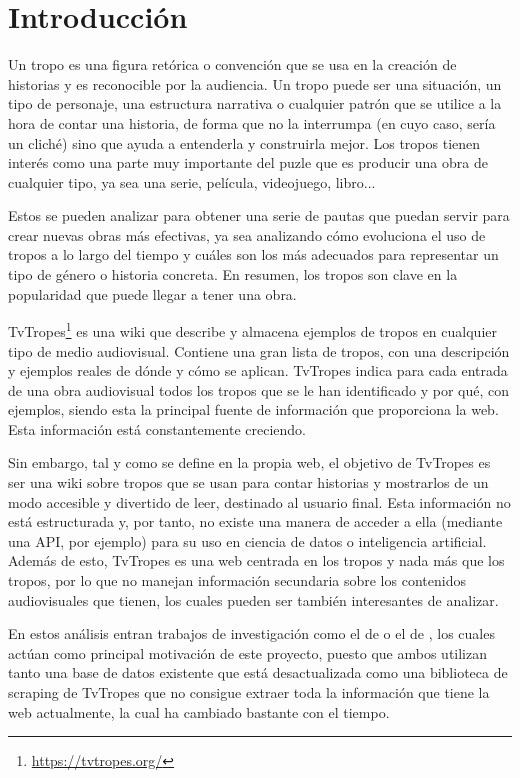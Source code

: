 \chapter{Introducción}

Un tropo es una figura retórica o convención que se usa en la creación de historias y es reconocible por la audiencia. Un tropo puede ser una situación, un tipo de personaje, una estructura narrativa o cualquier patrón que se utilice a la hora de contar una historia, de forma que no la interrumpa (en cuyo caso, sería un cliché) sino que ayuda a entenderla y construirla mejor. Los tropos tienen interés como una parte muy importante del puzle que es producir una obra de cualquier tipo, ya sea una serie, película, videojuego, libro... 

Estos se pueden analizar para obtener una serie de pautas que puedan servir para crear nuevas obras más efectivas, ya sea analizando cómo evoluciona el uso de tropos a lo largo del tiempo y cuáles son los más adecuados para representar un tipo de género o historia concreta. En resumen, los tropos son clave en la popularidad que puede llegar a tener una obra. 

TvTropes\footnote{\url{https://tvtropes.org/}} es una wiki que describe y almacena ejemplos de tropos en cualquier tipo de medio audiovisual. Contiene una gran lista de tropos, con una descripción y ejemplos reales de dónde y cómo se aplican. TvTropes indica para cada entrada de una obra audiovisual todos los tropos que se le han identificado y por qué, con ejemplos, siendo esta la principal fuente de información que proporciona la web. Esta información está constantemente creciendo.

Sin embargo, tal y como se define en la propia web, el objetivo de TvTropes es ser una wiki sobre tropos que se usan para contar historias y mostrarlos de un modo accesible y divertido de leer, destinado al usuario final. Esta información no está estructurada y, por tanto, no existe una manera de acceder a ella (mediante una API, por ejemplo) para su uso en ciencia de datos o inteligencia artificial. Además de esto, TvTropes es una web centrada en los tropos y nada más que los tropos, por lo que no manejan información secundaria sobre los contenidos audiovisuales que tienen, los cuales pueden ser también interesantes de analizar.

En estos análisis entran trabajos de investigación como el de \cite{garcia2020tropes} o el de \cite{garcia2021simpsons}, los cuales actúan como principal motivación de este proyecto, puesto que ambos utilizan tanto una base de datos existente que está desactualizada como una biblioteca de scraping de TvTropes que no consigue extraer toda la información que tiene la web actualmente, la cual ha cambiado bastante con el tiempo.

